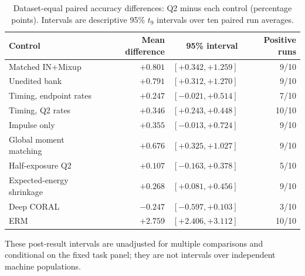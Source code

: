 \begin{table}[pos=htbp]
\centering\small
\caption{Dataset-equal paired accuracy differences: Q2 minus each control (percentage points). Intervals are descriptive 95\% $t_9$ intervals over ten paired run averages.}
\label{tab:paired}
\begin{tabular}{lrrr}
\toprule
Control & Mean difference & 95\% interval & Positive runs\\
\midrule
Matched IN+Mixup & $+0.801$ & $[+0.342, +1.259]$ & 9/10\\
Unedited bank & $+0.791$ & $[+0.312, +1.270]$ & 9/10\\
Timing, endpoint rates & $+0.247$ & $[-0.021, +0.514]$ & 7/10\\
Timing, Q2 rates & $+0.346$ & $[+0.243, +0.448]$ & 10/10\\
Impulse only & $+0.355$ & $[-0.013, +0.724]$ & 9/10\\
Global moment matching & $+0.676$ & $[+0.325, +1.027]$ & 9/10\\
Half-exposure Q2 & $+0.107$ & $[-0.163, +0.378]$ & 5/10\\
Expected-energy shrinkage & $+0.268$ & $[+0.081, +0.456]$ & 9/10\\
Deep CORAL & $-0.247$ & $[-0.597, +0.103]$ & 3/10\\
ERM & $+2.759$ & $[+2.406, +3.112]$ & 10/10\\
\bottomrule
\end{tabular}
\par\medskip\begin{minipage}{.98\linewidth}\footnotesize These post-result intervals are unadjusted for multiple comparisons and conditional on the fixed task panel; they are not intervals over independent machine populations.\end{minipage}
\end{table}
